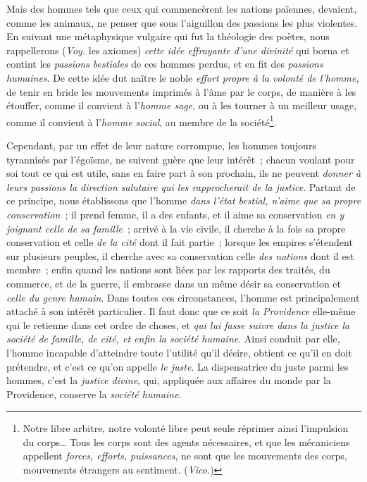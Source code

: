 \documentclass[french,twoside]{book} %
\begin{document}
Mais des hommes tels que ceux qui commencèrent les nations païennes, devaient, comme les animaux, ne penser que sous l’aiguillon des passions les plus violentes. En suivant une métaphysique vulgaire qui fut la théologie des poètes, nous  rappellerons ({\itshape Voy.} les axiomes) {\itshape cette idée effrayante d’une divinité} qui borna et contint les {\itshape passions bestiales} de ces hommes perdus, et en fit des {\itshape passions humaines}. De cette idée dut naître le noble {\itshape effort propre à la volonté de l’homme}, de tenir en bride les mouvements imprimés à l’âme par le corps, de manière à les étouffer, comme il convient à l’{\itshape homme sage}, ou à les tourner à un meilleur usage, comme il convient à l’{\itshape homme social}, au membre de la société\footnote{Notre libre arbitre, notre volonté libre peut seule réprimer ainsi l’impulsion du corps… Tous les corps sont des agents nécessaires, et que les mécaniciens appellent {\itshape forces, efforts, puissances}, ne sont que les mouvements des corps, mouvements étrangers au sentiment. ({\itshape Vico.})}.\par
Cependant, par un effet de leur nature corrompue, les hommes toujours tyrannisés par l’égoïsme, ne suivent guère que leur intérêt ; chacun voulant pour soi tout ce qui est utile, sans en faire part à son prochain, ils ne peuvent {\itshape donner à leurs passions la direction salutaire qui les rapprocherait de la justice}. Partant de ce principe, nous établissons que l’homme {\itshape dans l’état bestial, n’aime que sa propre conservation} ; il prend femme, il a des enfants, et il aime sa conservation {\itshape en y joignant celle de sa famille} ; arrivé à la vie civile, il cherche à la fois sa propre conservation et celle {\itshape de la cité} dont il fait partie ; lorsque les empires s’étendent sur plusieurs peuples, il cherche avec sa conservation celle {\itshape des nations} dont il est membre ; enfin quand les nations sont liées par les rapports des traités, du  commerce, et de la guerre, il embrasse dans un même désir sa conservation et {\itshape celle du genre humain}. Dans toutes ces circonstances, l’homme est principalement attaché à son intérêt particulier. Il faut donc que ce soit {\itshape la Providence} elle-même qui le retienne dans cet ordre de choses, et {\itshape qui lui fasse suivre dans la justice la société de famille, de cité, et enfin la société humaine}. Ainsi conduit par elle, l’homme incapable d’atteindre toute l’utilité qu’il désire, obtient ce qu’il en doit prétendre, et c’est ce qu’on appelle {\itshape le juste}. La dispensatrice du juste parmi les hommes, c’est la {\itshape justice divine}, qui, appliquée aux affaires du monde par la Providence, conserve la {\itshape société humaine}.\par
\end{document}
